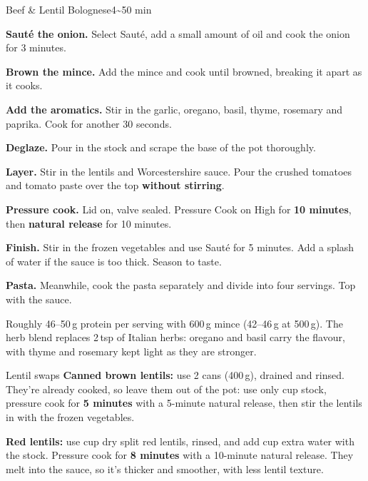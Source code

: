 \begin{recipebox}{Beef \& Lentil Bolognese}{4}{\textasciitilde50 min}
\begin{method}
  \item \textbf{Saut\'e the onion.} Select Saut\'e, add a small amount of oil and
        cook the onion for 3 minutes.
  \item \textbf{Brown the mince.} Add the mince and cook until browned, breaking
        it apart as it cooks.
  \item \textbf{Add the aromatics.} Stir in the garlic, oregano, basil, thyme,
        rosemary and paprika. Cook for another 30 seconds.
  \item \textbf{Deglaze.} Pour in the stock and scrape the base of the pot
        thoroughly.
  \item \textbf{Layer.} Stir in the lentils and Worcestershire sauce. Pour the
        crushed tomatoes and tomato paste over the top \textbf{without stirring}.
  \item \textbf{Pressure cook.} Lid on, valve sealed. Pressure Cook on High for
        \textbf{10 minutes}, then \textbf{natural release} for 10 minutes.
  \item \textbf{Finish.} Stir in the frozen vegetables and use Saut\'e for
        5 minutes. Add a splash of water if the sauce is too thick. Season to
        taste.
  \item \textbf{Pasta.} Meanwhile, cook the pasta separately and divide into four
        servings. Top with the sauce.
\end{method}

\begin{notes}
Roughly 46--50\,g protein per serving with 600\,g mince (42--46\,g at 500\,g).
The herb blend replaces 2\,tsp of Italian herbs: oregano and basil carry the
flavour, with thyme and rosemary kept light as they are stronger.
\end{notes}

\begin{variationbox}{Lentil swaps}
\textbf{Canned brown lentils:} use 2 cans (400\,g), drained and rinsed. They're
already cooked, so leave them out of the pot: use only  cup stock,
pressure cook for \textbf{5 minutes} with a 5-minute natural release, then stir
the lentils in with the frozen vegetables.

\textbf{Red lentils:} use  cup dry split red lentils, rinsed, and
add  cup extra water with the stock. Pressure cook for
\textbf{8 minutes} with a 10-minute natural release. They melt into the sauce,
so it's thicker and smoother, with less lentil texture.
\end{variationbox}


\end{recipebox}
